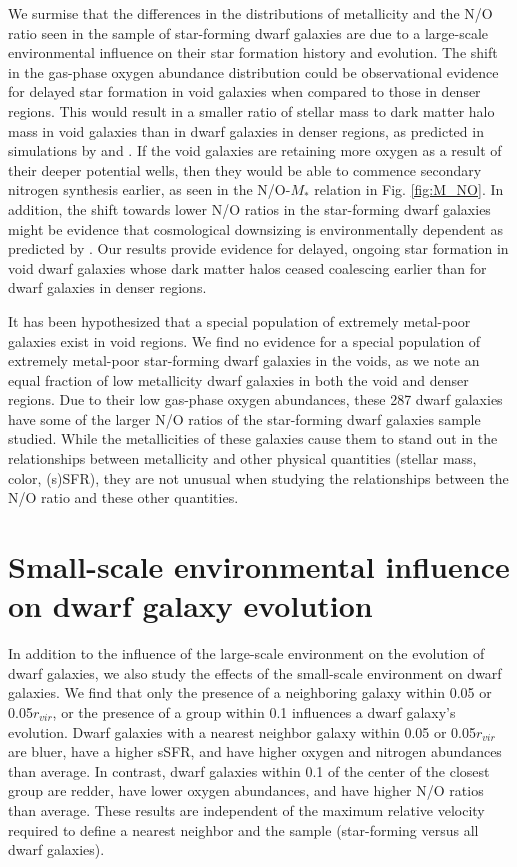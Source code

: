 We surmise that the differences in the distributions of metallicity and the N/O 
ratio seen in the sample of star-forming dwarf galaxies are due to a large-scale 
environmental influence on their star formation history and evolution.  The 
shift in the gas-phase oxygen abundance distribution could be observational 
evidence for delayed star formation in void galaxies when compared to those in 
denser regions.  This would result in a smaller ratio of stellar mass to dark 
matter halo mass in void galaxies than in dwarf galaxies in denser regions, as 
predicted in simulations by \cite{Jung14} and \cite{Tonnesen15}.  If the void 
galaxies are retaining more oxygen as a result of their deeper potential wells, 
then they would be able to commence secondary nitrogen synthesis earlier, as 
seen in the N/O-$M_*$ relation in Fig. \ref{fig:M_NO}.  In addition, the shift 
towards lower N/O ratios in the star-forming dwarf galaxies might be evidence 
that cosmological downsizing is environmentally dependent as predicted by 
\cite{Cen11}.  Our results provide evidence for delayed, ongoing star formation 
in void dwarf galaxies whose dark matter halos ceased coalescing earlier than 
for dwarf galaxies in denser regions.

It has been hypothesized that a special population of extremely metal-poor 
galaxies exist in void regions.  We find no evidence for a special population of 
extremely metal-poor star-forming dwarf galaxies in the voids, as we note an 
equal fraction of low metallicity dwarf galaxies in both the void and denser 
regions.  Due to their low gas-phase oxygen abundances, these 287 dwarf galaxies 
have some of the larger N/O ratios of the star-forming dwarf galaxies sample 
studied.  While the metallicities of these galaxies cause them to stand out in 
the relationships between metallicity and other physical quantities (stellar 
mass, color, (s)SFR), they are not unusual when studying the relationships 
between the N/O ratio and these other quantities.

\section[Small-scale environment]{Small-scale environmental influence on dwarf galaxy evolution}
In addition to the influence of the large-scale environment on the evolution of 
dwarf galaxies, we also study the effects of the small-scale environment on dwarf 
galaxies.  We find that only the presence of a neighboring galaxy within 0.05 
\hMpc or 0.05$r_{vir}$, or the presence of a group within 0.1 \hMpc influences a 
dwarf galaxy's evolution.  Dwarf galaxies with a nearest neighbor galaxy within 
0.05 \hMpc or 0.05$r_{vir}$ are bluer, have a higher sSFR, and have higher 
oxygen and nitrogen abundances than average.  In contrast, dwarf galaxies within 
0.1 \hMpc of the center of the closest group are redder, have lower oxygen 
abundances, and have higher N/O ratios than average.  These results are 
independent of the maximum relative velocity required to define a nearest 
neighbor and the sample (star-forming versus all dwarf galaxies).


